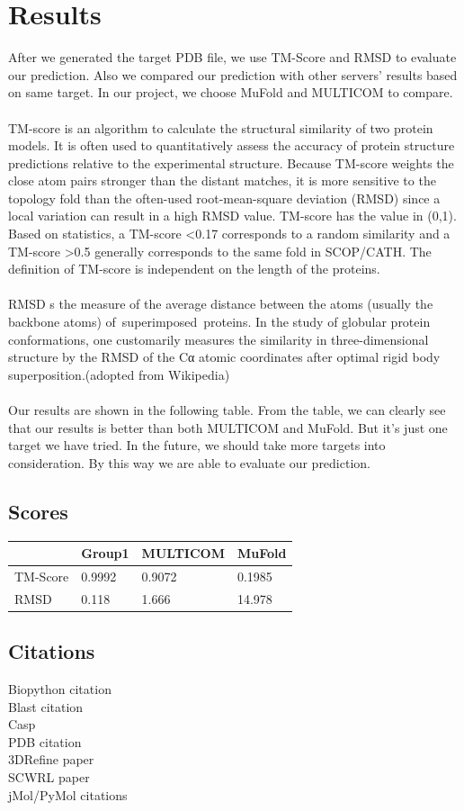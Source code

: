 \documentclass{article}
\begin{document}
\section{Results}

After we generated the target PDB file, we use TM-Score and RMSD to evaluate our prediction. Also we compared our prediction with other servers’ results based on same target. In our project, we choose MuFold and MULTICOM to compare.\\\\
TM-score is an algorithm to calculate the structural similarity of two protein models. It is often used to quantitatively assess the accuracy of protein structure predictions relative to the experimental structure. Because TM-score weights the close atom pairs stronger than the distant matches, it is more sensitive to the topology fold than the often-used root-mean-square deviation (RMSD) since a local variation can result in a high RMSD value. TM-score has the value in (0,1). Based on statistics, a TM-score \textless0.17 corresponds to a random similarity and a TM-score \textgreater0.5 generally corresponds to the same fold in SCOP/CATH. The definition of TM-score is independent on the length of the proteins.\\\\
RMSD s the measure of the average distance between the atoms (usually the backbone atoms) of superimposed proteins. In the study of globular protein conformations, one customarily measures the similarity in three-dimensional structure by the RMSD of the Cα atomic coordinates after optimal rigid body superposition.(adopted from Wikipedia)\\\\
Our results are shown in the following table. From the table, we can clearly see that our results is better than both MULTICOM and MuFold. But it’s just one target we have tried. In the future, we should take more targets into consideration. By this way we are able to evaluate our prediction.

\subsection{Scores}
\begin{center}
    \begin{tabular}{ | l | l | l | p{2cm} |}
    \hline
      & Group1 & MULTICOM & MuFold \\ \hline
    TM-Score & 0.9992 & 0.9072 & 0.1985 \\ \hline
    RMSD & 0.118 & 1.666 & 14.978 \\
    \hline
    \end{tabular}
\end{center}

\subsection{Citations}

Biopython citation\\
Blast citation\\
Casp\\
PDB citation\\
3DRefine paper\\
SCWRL paper\\
jMol/PyMol citations\\
\end{document}
